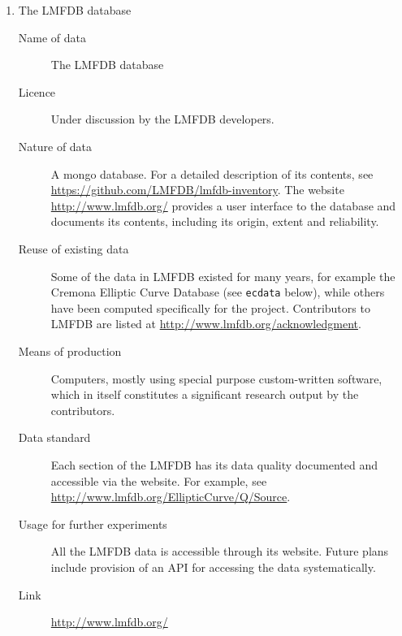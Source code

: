 \documentclass[12pt]{article}
\begin{document}
\begin{enumerate}

\item{The LMFDB database}
\begin{description}
\item[Name of data] The LMFDB database
\item[Licence]  Under discussion by the LMFDB developers.
\item[Nature of data] A mongo database.  For a detailed description of
  its contents, see \url{https://github.com/LMFDB/lmfdb-inventory}.
  The website \url{http://www.lmfdb.org/} provides a user interface to
  the database and documents its contents, including its origin,
  extent and reliability.
\item[Reuse of existing data] Some of the data in LMFDB existed for
  many years, for example the Cremona Elliptic Curve Database (see
  {\tt ecdata} below), while others have been computed specifically
    for the project.   Contributors to LMFDB are listed at
    \url{http://www.lmfdb.org/acknowledgment}.
\item[Means of production] Computers, mostly using special purpose
  custom-written software, which in itself constitutes a significant
  research output by the contributors.
\item[Data standard] Each section of the LMFDB has its data quality
  documented and accessible via the website.  For example, see
  \url{http://www.lmfdb.org/EllipticCurve/Q/Source}.
\item [Usage for further experiments] All the LMFDB data is accessible
  through its website.  Future plans include provision of an API for
  accessing the data systematically.
\item [Link] \url{http://www.lmfdb.org/}
\end{description}


\end{enumerate}
\end{document}
